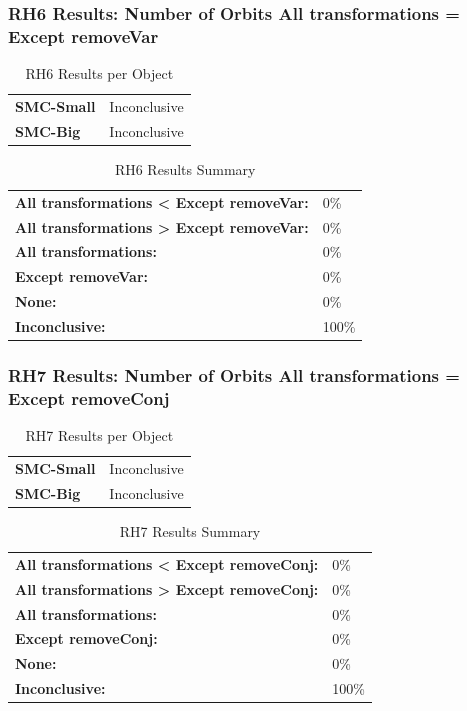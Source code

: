 \documentclass{article}\usepackage[]{graphicx}\usepackage[]{color}
\begin{document}
	
	

	
	\subsubsection{RH6 Results: Number of Orbits All transformations = Except removeVar}
	
	
	\begin{table}[H]
	\centering
	\caption{RH6 Results per Object}
	\begin{tabular}{ll}
	\textbf{SMC-Small} & Inconclusive \\
	\textbf{SMC-Big} & Inconclusive \\
	\end{tabular}
	\end{table}

	\begin{table}[H]
	\centering
	\caption{RH6 Results Summary}
	\begin{tabular}{ll}
	\textbf{All transformations \textless{} Except removeVar:}& 0\% \\
	\textbf{All transformations \textgreater{} Except removeVar:}& 0\%\\
	\textbf{All transformations:} & 0\%\\
	\textbf{Except removeVar:} & 0\%\\
	\textbf{None:}& 0\%\\
	\textbf{Inconclusive:}& 100\%
			
	
	\end{tabular}
	\end{table}
	
	
	

	
	\subsubsection{RH7 Results: Number of Orbits All transformations = Except removeConj}
	
	
	\begin{table}[H]
	\centering
	\caption{RH7 Results per Object}
	\begin{tabular}{ll}
	\textbf{SMC-Small} & Inconclusive \\
	\textbf{SMC-Big} & Inconclusive \\
	\end{tabular}
	\end{table}

	\begin{table}[H]
	\centering
	\caption{RH7 Results Summary}
	\begin{tabular}{ll}
	\textbf{All transformations \textless{} Except removeConj:}& 0\% \\
	\textbf{All transformations \textgreater{} Except removeConj:}& 0\%\\
	\textbf{All transformations:} & 0\%\\
	\textbf{Except removeConj:} & 0\%\\
	\textbf{None:}& 0\%\\
	\textbf{Inconclusive:}& 100\%
			
	
	\end{tabular}
	\end{table}
	
\end{document}
